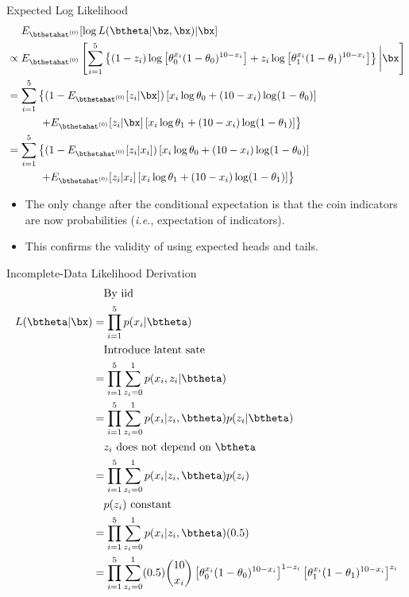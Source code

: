 \documentclass[dvipdfmx,bigger,aspectratio=169]{beamer}
\begin{document}
\begin{frame}[allowframebreaks,label=,t]{Expected Log Likelihood}
\begin{align*}
\label{eq:org9f7abd0}
  &~~~~E_{\bthetahat^{(0)}}[\log L(\btheta | \bz,\bx) | \bx]\\
  &\propto E_{\bthetahat^{(0)}} \left[ \sum^{5}_{i=1}
    \left\{
    (1-z_{i}) \log \left[ \theta_{0}^{x_{i}}(1-\theta_{0})^{10-x_{i}} \right] +
    z_{i} \log \left[ \theta_{1}^{x_{i}}(1-\theta_{1})^{10-x_{i}} \right]
    \right\} \bigg| \bx \right]\\
  &= \sum^{5}_{i=1}
    \left\{
    (1- E_{\bthetahat^{(0)}}[z_{i} | \bx]) \left[ x_{i}\log\theta_{0} + (10-x_{i})\log(1-\theta_{0})\right]
    \right.\\
  &~~~~~~~~~ \left.
    + E_{\bthetahat^{(0)}}[z_{i} | \bx] \left[ x_{i}\log\theta_{1} + (10-x_{i})\log(1-\theta_{1})\right]
    \right\}\\
  &= \sum^{5}_{i=1}
    \left\{
    (1- E_{\bthetahat^{(0)}}[z_{i} | x_{i}]) \left[ x_{i}\log\theta_{0} + (10-x_{i})\log(1-\theta_{0})\right]
    \right.\\
  &~~~~~~~~~ \left.
    + E_{\bthetahat^{(0)}}[z_{i} | x_{i}] \left[ x_{i}\log\theta_{1} + (10-x_{i})\log(1-\theta_{1})\right]
    \right\}
\end{align*}
\begin{itemize}
\item The only change after the conditional expectation is that the coin indicators are now probabilities (\textit{i.e.}, expectation of indicators).
\item This confirms the validity of using expected heads and tails.
\end{itemize}
\end{frame}

\begin{frame}[allowframebreaks,label=,t]{Incomplete-Data Likelihood Derivation}
\begin{align*}
\label{eq:org42c77c5}
  &~~~\text{By iid}\\
  L(\btheta | \bx)
  &= \prod^{5}_{i=1}p(x_{i} | \btheta)\\
  &~~~\text{Introduce latent sate}\\
  &= \prod^{5}_{i=1} \sum^{1}_{z_{i}=0} p(x_{i}, z_{i} | \btheta)\\
  &= \prod^{5}_{i=1} \sum^{1}_{z_{i}=0} p(x_{i} | z_{i}, \btheta) p(z_{i} | \btheta)\\
  &~~~\text{$z_{i}$ does not depend on $\btheta$}\\
  &= \prod^{5}_{i=1} \sum^{1}_{z_{i}=0} p(x_{i} | z_{i}, \btheta) p(z_{i})\\
  &~~~\text{$p(z_{i})$ constant}\\
  &= \prod^{5}_{i=1} \sum^{1}_{z_{i}=0} p(x_{i} | z_{i}, \btheta) (0.5)\\
  &= \prod^{5}_{i=1} \sum^{1}_{z_{i}=0}
    (0.5) \binom{10}{x_{i}}
    \left[ \theta_{0}^{x_{i}}(1-\theta_{0})^{10-x_{i}} \right]^{1-z_{i}}
    \left[ \theta_{1}^{x_{i}}(1-\theta_{1})^{10-x_{i}} \right]^{z_{i}}\\
\end{align*}
\end{frame}
\end{document}
